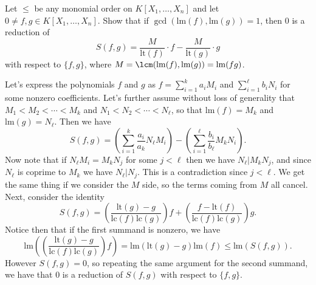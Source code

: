 \documentclass[11pt,letterpaper]{article}
\providecommand{\lm}{\mathrm{lm}}
\providecommand{\lt}{\mathrm{lt}}
\begin{document}
\begin{problem}
Let $\leq$ be any monomial order on $K[X_1,\dots,X_n]$ and let $0\neq f,g\in K[X_1,\dots,X_n]$. Show that if $\gcd(\lm(f),\lm(g)) = 1$, then $0$ is a reduction of
\[
S(f,g) = \frac{M}{\lt(f)}\cdot f - \frac{M}{\lt(g)}\cdot g
\]
with respect to $\{f,g\}$, where $M = \lcm(\lm(f),\lm(g))=\lm(fg)$.
\end{problem}

\begin{solution}
    Let's express the polynomials $f$ and $g$ as $f=\sum_{i=1}^k a_i M_i$ and $\sum_{i=1}^\ell b_iN_i$ for some nonzero coefficients. Let's further assume without loss of generality that $M_1 < M_2 < \cdots < M_k$ and $N_1 < N_2 < \cdots < N_\ell$, so that $\lm(f)=M_k$ and $\lm(g)=N_\ell$. Then we have
    \[
        S(f,g)=\left(\sum^k_{i=1} \frac{a_i}{a_k}N_\ell M_i\right)-\left(\sum^\ell_{i=1} \frac{b_i}{b_\ell} M_k N_i\right)
    .\] 
    Now note that if $N_\ell M_i = M_k N_j$ for some $j < \ell$ then we have $N_{\ell} | M_k N_j$, and since $N_\ell$ is coprime to $M_k$ we have $N_\ell | N_j$. This is a contradiction since $j<\ell$. We get the same thing if we consider the $M$ side, so the terms coming from $M$ all cancel. Next, consider the identity
    \[
        S(f,g)=\left(\frac{\textrm{lt}(g)-g}{\textrm{lc}(f)\textrm{lc}(g)}\right)f + \left(\frac{f-\textrm{lt}(f)}{\textrm{lc}(f)\textrm{lc}(g)}\right)g
    .\] 
    Notice then that if the first summand is nonzero, we have
    \[
        \lm\left(\left(\frac{\textrm{lt}(g)-g}{\textrm{lc}(f)\textrm{lc}(g)}\right)f\right) = \lm(\textrm{lt}(g)-g)\lm(f)\leq \lm(S(f,g))
    .\] 
    However $S(f,g)=0$, so repeating the same argument for the second summand, we have that $0$ is a reduction of $S(f,g)$ with respect to $\{f, g\}$.
\end{solution}



\end{document}
